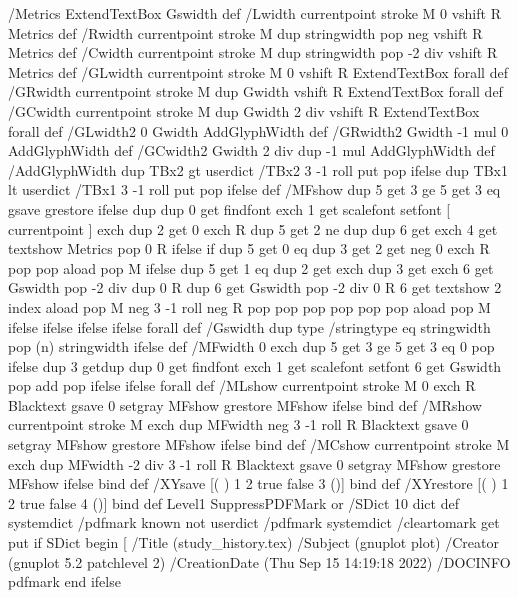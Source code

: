 %
/Metrics {ExtendTextBox Gswidth} def
/Lwidth {currentpoint stroke M 0 vshift R Metrics} def
/Rwidth {currentpoint stroke M dup stringwidth pop neg vshift R Metrics} def
/Cwidth {currentpoint stroke M dup stringwidth pop -2 div vshift R Metrics} def
/GLwidth {currentpoint stroke M 0 vshift R {ExtendTextBox} forall} def
/GRwidth {currentpoint stroke M dup Gwidth vshift R {ExtendTextBox} forall} def
/GCwidth {currentpoint stroke M dup Gwidth 2 div vshift R {ExtendTextBox} forall} def
/GLwidth2 {0 Gwidth AddGlyphWidth} def
/GRwidth2 {Gwidth -1 mul 0 AddGlyphWidth} def
/GCwidth2 {Gwidth 2 div dup -1 mul AddGlyphWidth} def
/AddGlyphWidth { dup TBx2 gt {userdict /TBx2 3 -1 roll put} {pop} ifelse
                 dup TBx1 lt {userdict /TBx1 3 -1 roll put} {pop} ifelse } def
/MFshow {
   { dup 5 get 3 ge
     { 5 get 3 eq {gsave} {grestore} ifelse }
     {dup dup 0 get findfont exch 1 get scalefont setfont
     [ currentpoint ] exch dup 2 get 0 exch R dup 5 get 2 ne {dup dup 6
     get exch 4 get {textshow} {Metrics pop 0 R} ifelse }if dup 5 get 0 eq
     {dup 3 get {2 get neg 0 exch R pop} {pop aload pop M} ifelse} {dup 5
     get 1 eq {dup 2 get exch dup 3 get exch 6 get Gswidth pop -2 div
     dup 0 R} {dup 6 get Gswidth pop -2 div 0 R 6 get
     textshow 2 index {aload pop M neg 3 -1 roll neg R pop pop} {pop pop pop
     pop aload pop M} ifelse }ifelse }ifelse }
     ifelse }
   forall} def
/Gswidth {dup type /stringtype eq {stringwidth} {pop (n) stringwidth} ifelse} def
/MFwidth {0 exch { dup 5 get 3 ge { 5 get 3 eq { 0 } { pop } ifelse }
 {dup 3 get{dup dup 0 get findfont exch 1 get scalefont setfont
     6 get Gswidth pop add} {pop} ifelse} ifelse} forall} def
/MLshow { currentpoint stroke M
  0 exch R
  Blacktext {gsave 0 setgray MFshow grestore} {MFshow} ifelse } bind def
/MRshow { currentpoint stroke M
  exch dup MFwidth neg 3 -1 roll R
  Blacktext {gsave 0 setgray MFshow grestore} {MFshow} ifelse } bind def
/MCshow { currentpoint stroke M
  exch dup MFwidth -2 div 3 -1 roll R
  Blacktext {gsave 0 setgray MFshow grestore} {MFshow} ifelse } bind def
/XYsave    { [( ) 1 2 true false 3 ()] } bind def
/XYrestore { [( ) 1 2 true false 4 ()] } bind def
Level1 SuppressPDFMark or 
{} {
/SDict 10 dict def
systemdict /pdfmark known not {
  userdict /pdfmark systemdict /cleartomark get put
} if
SDict begin [
  /Title (study_history.tex)
  /Subject (gnuplot plot)
  /Creator (gnuplot 5.2 patchlevel 2)
  /CreationDate (Thu Sep 15 14:19:18 2022)
  /DOCINFO pdfmark
end
} ifelse
%
